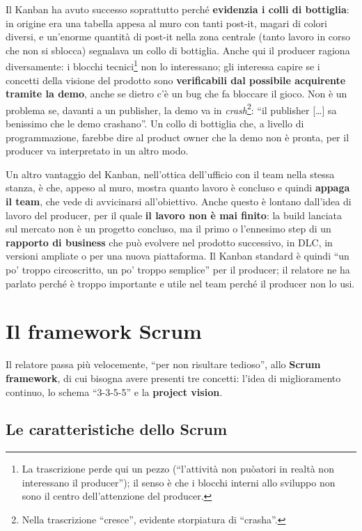 Il Kanban ha avuto successo soprattutto perché \textbf{evidenzia i colli di
bottiglia}: in origine era una tabella appesa al muro con tanti post-it,
magari di colori diversi, e un'enorme quantità di post-it nella zona centrale
(tanto lavoro in corso che non si sblocca) segnalava un collo di bottiglia.
Anche qui il producer ragiona diversamente: i blocchi tecnici\footnote{La
trascrizione perde qui un pezzo (``l'attività non puòatori in realtà non
interessano il producer''); il senso è che i blocchi interni allo sviluppo non
sono il centro dell'attenzione del producer.} non lo interessano; gli interessa
capire se i concetti della visione del prodotto sono \textbf{verificabili dal
possibile acquirente tramite la demo}, anche se dietro c'è un bug che fa bloccare
il gioco. Non è un problema se, davanti a un publisher, la demo va in
\emph{crash}\footnote{Nella trascrizione ``cresce'', evidente storpiatura di
``crasha''.}: ``il publisher [\dots] sa benissimo che le demo crashano''. Un
collo di bottiglia che, a livello di programmazione, farebbe dire al product
owner che la demo non è pronta, per il producer va interpretato in un altro modo.

Un altro vantaggio del Kanban, nell'ottica dell'ufficio con il team nella stessa
stanza, è che, appeso al muro, mostra quanto lavoro è concluso e quindi
\textbf{appaga il team}, che vede di avvicinarsi all'obiettivo. Anche questo è
lontano dall'idea di lavoro del producer, per il quale \textbf{il lavoro non è mai
finito}: la build lanciata sul mercato non è un progetto concluso, ma il primo o
l'ennesimo step di un \textbf{rapporto di business} che può evolvere nel prodotto
successivo, in DLC, in versioni ampliate o per una nuova piattaforma. Il Kanban
standard è quindi ``un po' troppo circoscritto, un po' troppo semplice'' per il
producer; il relatore ne ha parlato perché è troppo importante e utile nel team
perché il producer non lo usi.

\section{Il framework Scrum}
\label{sec:z5-scrum}

Il relatore passa più velocemente, ``per non risultare tedioso'', allo
\textbf{Scrum framework}, di cui bisogna avere presenti tre concetti: l'idea di
miglioramento continuo, lo schema ``3-3-5-5'' e la \textbf{project vision}.

\subsection{Le caratteristiche dello Scrum}

